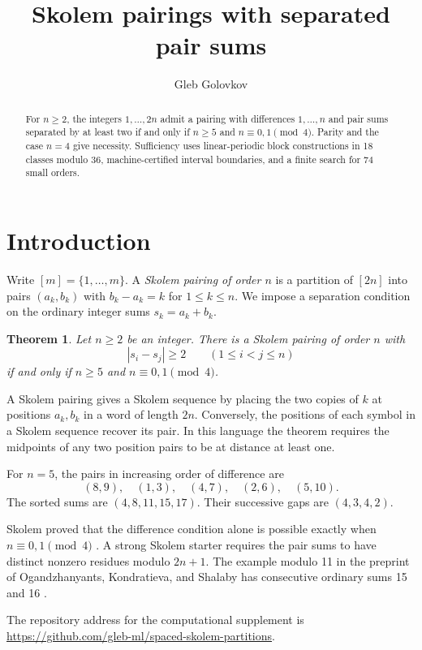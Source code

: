 \documentclass[11pt]{amsart}
\title{Skolem pairings with separated pair sums}
\author{Gleb Golovkov}
\newtheorem{theorem}{Theorem}
\begin{document}
\begin{abstract}
For \(n\ge2\), the integers \(1,\ldots,2n\) admit a pairing with
differences \(1,\ldots,n\) and pair sums separated by at least two
if and only if \(n\ge5\) and \(n\equiv0,1\pmod4\).
Parity and the case \(n=4\) give necessity.
Sufficiency uses linear-periodic block constructions in 18 classes
modulo 36, machine-certified interval boundaries, and a finite
search for 74 small orders.
\end{abstract}

\maketitle

\section{Introduction}

Write \([m]=\{1,\ldots,m\}\). A \emph{Skolem pairing of order \(n\)}
is a partition of \([2n]\) into pairs \((a_k,b_k)\) with
\(b_k-a_k=k\) for \(1\le k\le n\). We impose a separation condition
on the ordinary integer sums \(s_k=a_k+b_k\).

\begin{theorem}\label{thm:main}
Let \(n\ge2\) be an integer. There is a Skolem pairing of order \(n\) with
\[
  |s_i-s_j|\ge2\qquad(1\le i<j\le n)
\]
if and only if \(n\ge5\) and \(n\equiv0,1\pmod4\).
\end{theorem}

A Skolem pairing gives a Skolem sequence by placing the two
copies of \(k\) at positions \(a_k,b_k\) in a word of length
\(2n\). Conversely, the positions of each symbol in a Skolem
sequence recover its pair. In this language the theorem
requires the midpoints of any two position pairs to be at
distance at least one.

For \(n=5\), the pairs in increasing order of difference are
\[
  (8,9),\quad (1,3),\quad (4,7),\quad (2,6),\quad (5,10).
\]
The sorted sums are \((4,8,11,15,17)\). Their successive
gaps are \((4,3,4,2)\).

Skolem proved that the difference condition alone is possible
exactly when \(n\equiv0,1\pmod4\) \cite{skolem}. A strong Skolem
starter requires the pair sums to have distinct nonzero residues
modulo \(2n+1\). The example modulo 11 in the preprint of
Ogandzhanyants, Kondratieva, and Shalaby has consecutive ordinary
sums 15 and 16 \cite[Example~1.6]{strong}.

The repository address for the computational supplement is\newline
\url{https://github.com/gleb-ml/spaced-skolem-partitions}.
\end{document}
